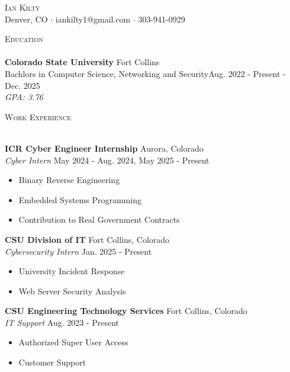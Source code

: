 \documentclass[a4paper]{article}
\newcommand{\lineunder} {
    \vspace*{-8pt} \\
    \hspace*{-18pt} \hrulefill \\
}
\newcommand{\header} [1] {
    {\hspace*{-18pt}\vspace*{6pt} \textsc{#1}}
    \vspace*{-6pt} \lineunder
}
\begin{document}
\vspace*{-40pt}

    

\vspace*{-10pt}
\begin{center}
	{\Huge \scshape {Ian Kilty}}\\
	Denver, CO $\cdot$ iankilty1@gmail.com $\cdot$ 303-941-0929\\
\end{center}

\header{Education}
\textbf{Colorado State University}
\hfill Fort Collins\\

Bachlors in Computer Science, Networking and Security\hfill Aug. 2022 - Present - Dec. 2025\\

\textit{GPA: 3.76}
\vspace{2mm}

\header{Work Experience}
\vspace{1mm}

\textbf{ICR Cyber Engineer Internship} \hfill Aurora, Colorado\\
\textit{Cyber Intern} \hfill May 2024 - Aug. 2024, May 2025 - Present\textbf{}\\
\vspace{-1mm}
\begin{itemize} \itemsep 1pt
    \item Binary Reverse Engineering
	\item Embedded Systems Programming
	\item Contribution to Real Government Contracts
\end{itemize}

\textbf{CSU Division of IT} \hfill Fort Collins, Colorado\\
\textit{Cybersecurity Intern} \hfill Jan. 2025 - Present\\
\vspace{-1mm}
\begin{itemize} \itemsep 1pt
	\item University Incident Response
	\item Web Server Security Analysis
\end{itemize}

\textbf{CSU Engineering Technology Services} \hfill Fort Collins, Colorado\\
\textit{IT Support} \hfill Aug. 2023 - Present\\
\vspace{-1mm}
\begin{itemize} \itemsep 1pt
	\item Authorized Super User Access
    \item Customer Support
\end{itemize}
\end{document}

